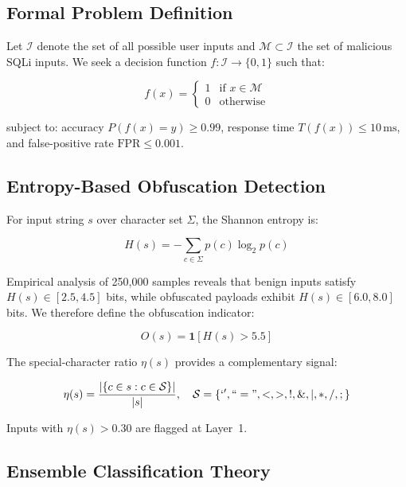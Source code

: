 \documentclass[10pt, twocolumn]{article}
\begin{document}
\subsection{Formal Problem Definition}

Let $\mathcal{I}$ denote the set of all possible user inputs and 
$\mathcal{M} \subset \mathcal{I}$ the set of malicious SQLi inputs. 
We seek a decision function $f: \mathcal{I} \rightarrow \{0,1\}$ such that:

\begin{equation}
f(x) = \begin{cases}
  1 & \text{if } x \in \mathcal{M} \\
  0 & \text{otherwise}
\end{cases}
\end{equation}

subject to: accuracy $P(f(x)=y) \geq 0.99$, 
response time $T(f(x)) \leq 10\,\text{ms}$, and 
false-positive rate $\text{FPR} \leq 0.001$.

\subsection{Entropy-Based Obfuscation Detection}

For input string $s$ over character set $\Sigma$, the Shannon entropy is:

\begin{equation}
H(s) = -\sum_{c \in \Sigma} p(c) \log_2 p(c)
\end{equation}

Empirical analysis of 250,000 samples reveals that benign inputs satisfy 
$H(s) \in [2.5, 4.5]$ bits, while obfuscated payloads exhibit 
$H(s) \in [6.0, 8.0]$ bits. We therefore define the obfuscation indicator:

\begin{equation}
O(s) = \mathbf{1}[H(s) > 5.5]
\end{equation}

The special-character ratio $\eta(s)$ provides a complementary signal:

\begin{equation}
\eta(s) = \frac{|\{c \in s : c \in \mathcal{S}\}|}{|s|}, \quad \mathcal{S} = \{`', ``=", <, >, !, \&, |, *, /, ;\}
\end{equation}

Inputs with $\eta(s) > 0.30$ are flagged at Layer~1.

\subsection{Ensemble Classification Theory}
\end{document}

